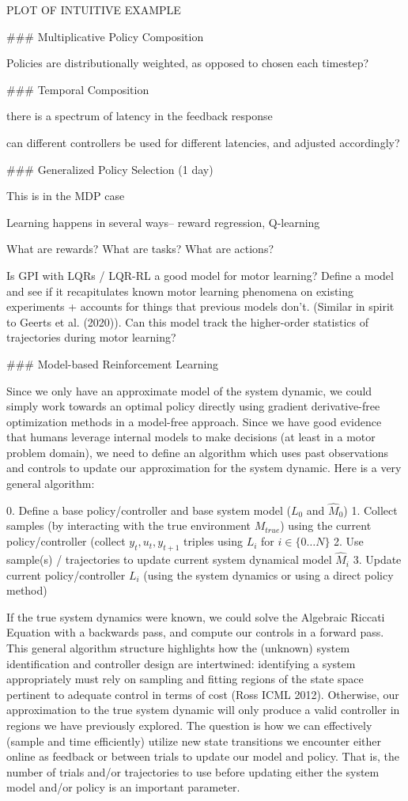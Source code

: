 \documentclass[../main.tex]{subfiles}
\begin{document}
{{{  PLOT OF INTUITIVE EXAMPLE
  
  ### Multiplicative Policy Composition
  
  Policies are distributionally weighted, as opposed to chosen each timestep? 
  
  ### Temporal Composition
  
  there is a spectrum of latency in the feedback response
  
  can different controllers be used for different latencies, and adjusted accordingly?
  
  ### Generalized Policy Selection (1 day)
  
  This is in the MDP case
  
  Learning happens in several ways-- reward regression, Q-learning
  
  What are rewards? 
  What are tasks?
  What are actions?
  
  Is GPI with LQRs / LQR-RL a good model for motor learning? Define a model and see if it recapitulates known motor learning phenomena on existing experiments + accounts for things that previous models don’t. (Similar in spirit to Geerts et al. (2020)). Can this model track the higher-order statistics of trajectories during motor learning?
  
  ### Model-based Reinforcement Learning
  
  Since we only have an approximate model of the system dynamic, we could simply work towards an optimal policy directly using gradient derivative-free optimization methods in a model-free approach. Since we have good evidence that humans leverage internal models to make decisions (at least in a motor problem domain), we need to define an algorithm which uses past observations and controls to update our approximation for the system dynamic. Here is a very general algorithm:
  
  0. Define a base policy/controller and base system model ($L_0$ and $\hat{M}_0$)
  1. Collect samples (by interacting with the true environment $M_{true}$) using the current policy/controller (collect $y_t,u_t,y_{t+1}$ triples using $L_i$ for $i \in \{0\dots N\}$
  2. Use sample(s) / trajectories to update current system dynamical model $\hat{M}_i$
  3. Update current policy/controller $L_i$ (using the system dynamics or using a direct policy method)
  
  If the true system dynamics were known, we could solve the Algebraic Riccati Equation with a backwards pass, and compute our controls in a forward pass. This general algorithm structure highlights how the (unknown) system identification and controller design are intertwined: identifying a system appropriately must rely on sampling and fitting regions of the state space pertinent to adequate control in terms of cost (Ross ICML 2012). Otherwise, our approximation to the true system dynamic will only produce a valid controller in regions we have previously explored. The question is how we can effectively (sample and time efficiently) utilize new state transitions we encounter either online as feedback or between trials to update our model and policy. That is, the number of trials and/or trajectories to use before updating either the system model and/or policy is an important parameter.
  
}}}
\end{document}
